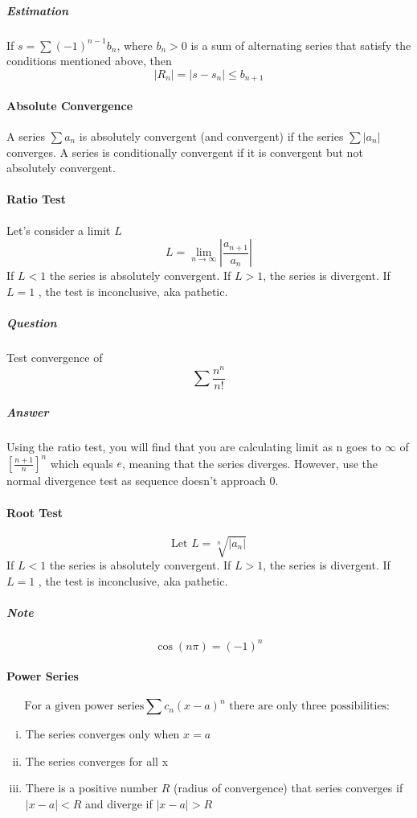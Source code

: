 \documentclass{article}
\begin{document}
\subparagraph{Estimation}
If $ s = \sum (-1)^{n-1}b_n $, where $ b_n>0 $  is a sum of alternating series that satisfy the conditions mentioned above, then 
\[
	| R_n| = | s - s_n | \leq b_{n+1}
\]


\noindent\hrulefill 

\paragraph{Absolute Convergence}
A series $\sum a_n$ is absolutely convergent (and convergent) if the series $ \sum |a_n| $ converges. A series is conditionally convergent if it is convergent but not absolutely convergent.

\paragraph{Ratio Test}

Let's consider a limit $ L $ 
\[
	L = \lim_{n \to \infty} | \frac{ a_{n+1} }{ a_n } |
\]
If $ L<1 $  the series is absolutely convergent. If $ L>1 $, the series is divergent. If $ L=1 $ , the test is inconclusive, aka pathetic.

\subparagraph{Question}
Test convergence of $$ \sum \frac{ n^n }{ n! }	$$

\subparagraph{Answer}
Using the ratio test, you will find that you are calculating limit as n goes to $\infty$ of $ \left[ \frac{n+1}{n}	 \right]^n  $ which equals $ e $, meaning that the series diverges. However, use the normal divergence test as sequence doesn't approach 0.

\paragraph{Root Test}
\[
	\text{Let } L = \sqrt[n]{|a_n|}
\]
If $ L<1 $  the series is absolutely convergent. If $ L>1 $, the series is divergent. If $ L=1 $ , the test is inconclusive, aka pathetic.

\subparagraph{Note}
$$ \cos{ (n \pi) } = (-1)^n	$$

\newpage

\paragraph{Power Series}
\[
	\text{For a given power series} \sum c_n (x-a)^n \text{ there are only three possibilities: }
\]
\begin{enumerate}[i.]
\item The series converges only when $x=a$
\item The series converges for all x
\item There is a positive number $R$ (radius of convergence) that series converges if $ |x-a|<R $ and diverge if $ |x-a|>R $  
\end{enumerate}
\end{document}
